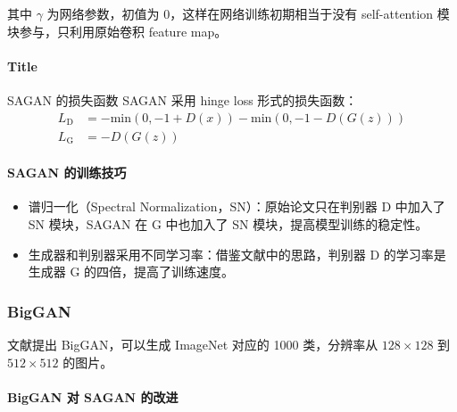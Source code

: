 其中 $\gamma$ 为网络参数，初值为 0，这样在网络训练初期相当于没有 self-attention
模块参与，只利用原始卷积 feature map。

\paragraph{Title}{SAGAN 的损失函数}
SAGAN 采用 hinge loss 形式的损失函数：
\begin{align}
  L_{\mathrm{D}} & = -\mathrm{min} \left( 0, -1 + D(x) \right) - \mathrm{min} \left( 0, -1-D(G(z)) \right) \\
  L_{\mathrm{G}} & = -D(G(z))
\end{align}

\paragraph{SAGAN 的训练技巧}
\begin{itemize}
  \item 谱归一化（Spectral Normalization，SN）：原始论文只在判别器 D 中加入了 SN
    模块，SAGAN 在 G 中也加入了 SN 模块，提高模型训练的稳定性。
  \item 生成器和判别器采用不同学习率：借鉴文献中的思路，判别器
    D 的学习率是生成器 G 的四倍，提高了训练速度。
\end{itemize}

\subsubsection{BigGAN}
文献提出 BigGAN，可以生成 ImageNet 对应的 1000 类，分辨率从
$128 \times 128$ 到 $512 \times 512$ 的图片。

\paragraph{BigGAN 对 SAGAN 的改进}

